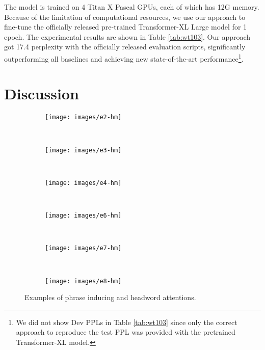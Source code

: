 \documentclass[11pt,a4paper]{article}
\begin{document}
The model is trained on 4 Titan X Pascal GPUs, each of which has 12G memory. Because of the limitation of computational resources, we use our approach to fine-tune the officially released pre-trained Transformer-XL Large model for 1 epoch. The experimental results are shown in Table \ref{tab:wt103}. Our approach got 17.4 perplexity with the officially released evaluation scripts, significantly outperforming all baselines and achieving new state-of-the-art performance\footnote{We did not show Dev PPLs in Table \ref{tab:wt103} since only the correct approach to reproduce the test PPL was provided with the pretrained Transformer-XL model.}.

\section{Discussion}

\begin{figure*}[t!]
    \centering
    \begin{subfigure}[t]{0.45\textwidth}
        \centering
        \texttt{[image: images/e2-hm]}
        \caption{}
        \label{fig:e2:a}
    \end{subfigure}
    ~ 
    \begin{subfigure}[t]{0.45\textwidth}
        \centering
        \texttt{[image: images/e3-hm]}
        \caption{}
        \label{fig:e2:b}
    \end{subfigure}
    ~
    \begin{subfigure}[t]{0.45\textwidth}
        \centering
        \texttt{[image: images/e4-hm]}
        \caption{}
        \label{fig:e2:c}
    \end{subfigure}
    ~
    \begin{subfigure}[t]{0.45\textwidth}
        \centering
        \texttt{[image: images/e6-hm]}
        \caption{}
        \label{fig:e2:d}
    \end{subfigure}
    ~
    \begin{subfigure}[t]{0.45\textwidth}
        \centering
        \texttt{[image: images/e7-hm]}
        \caption{}
        \label{fig:e2:e}
    \end{subfigure}
    ~
    \begin{subfigure}[t]{0.45\textwidth}
        \centering
        \texttt{[image: images/e8-hm]}
        \caption{}
        \label{fig:e2:f}
    \end{subfigure}
    \caption{Examples of phrase inducing and headword attentions.}
    \label{fig:e2}
\end{figure*}
\end{document}
